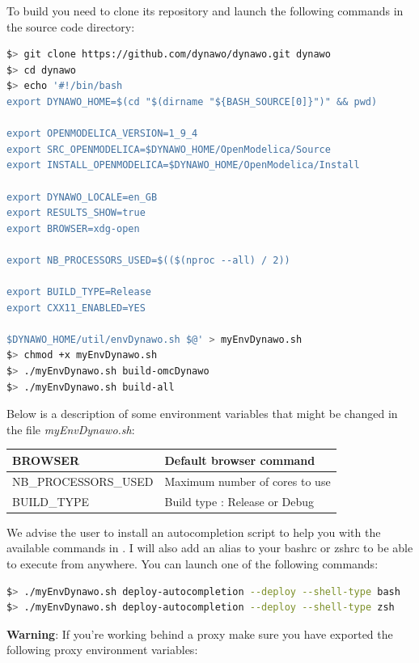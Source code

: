 \documentclass[a4paper, 12pt]{report}
\begin{document}
To build \Dynawo you need to clone its repository and launch the following commands in the source code directory:

\begin{lstlisting}[language=bash]
$> git clone https://github.com/dynawo/dynawo.git dynawo
$> cd dynawo
$> echo '#!/bin/bash
export DYNAWO_HOME=$(cd "$(dirname "${BASH_SOURCE[0]}")" && pwd)

export OPENMODELICA_VERSION=1_9_4
export SRC_OPENMODELICA=$DYNAWO_HOME/OpenModelica/Source
export INSTALL_OPENMODELICA=$DYNAWO_HOME/OpenModelica/Install

export DYNAWO_LOCALE=en_GB
export RESULTS_SHOW=true
export BROWSER=xdg-open

export NB_PROCESSORS_USED=$(($(nproc --all) / 2))

export BUILD_TYPE=Release
export CXX11_ENABLED=YES

$DYNAWO_HOME/util/envDynawo.sh $@' > myEnvDynawo.sh
$> chmod +x myEnvDynawo.sh
$> ./myEnvDynawo.sh build-omcDynawo
$> ./myEnvDynawo.sh build-all
\end{lstlisting}

Below is a description of some environment variables that might be changed in the file \textit{myEnvDynawo.sh}:

\begin{center}
\begin{tabular}{|l|l|}
  \hline
   BROWSER & Default browser command \\
  \hline
   NB\_PROCESSORS\_USED & Maximum number of cores to use \\
  \hline
   BUILD\_TYPE & Build type : Release or Debug \\
  \hline
\end{tabular}
\end{center}

We advise the user to install an autocompletion script to help you with the available commands in \Dynawo. I will also add an alias to your bashrc or zshrc to be able to execute \Dynawo from anywhere. You can launch one of the following commands:
\begin{lstlisting}[language=bash,deletekeywords={help,source}]
$> ./myEnvDynawo.sh deploy-autocompletion --deploy --shell-type bash
$> ./myEnvDynawo.sh deploy-autocompletion --deploy --shell-type zsh
\end{lstlisting}

\textbf{Warning}: If you're working behind a proxy make sure you have exported the following proxy environment variables:
\end{document}
